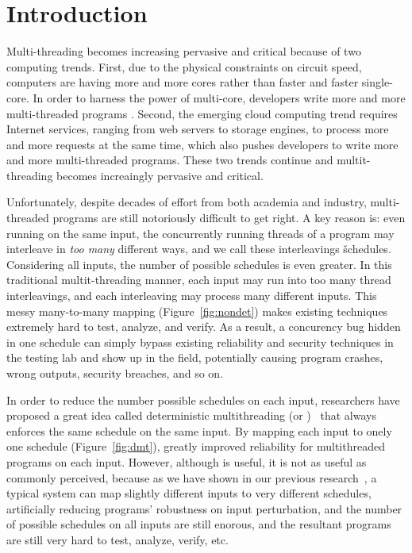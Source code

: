 \section{Introduction} \label{ch:intro}

Multi-threading becomes increasing pervasive and critical because of two 
computing trends. First, due to the physical constraints on circuit speed, computers are having
more and more cores rather than faster and faster single-core. In order to 
harness the power of multi-core, developers write more and more multi-threaded programs . 
Second, the emerging cloud computing trend requires Internet services, ranging from 
web servers to storage engines, to process more and more requests at the same time, which also 
pushes developers to write more and more multi-threaded programs. These two trends continue and 
multit-threading becomes increaingly pervasive and critical.

Unfortunately, despite decades of effort from both academia and industry, 
multi-threaded programs are still notoriously difficult to get right. A key 
reason is: even running on the same input, the concurrently running threads of 
a program may interleave in \emph{too many} different ways, and we call these interleavings 
\v{schedules}. Considering all inputs, the number of possible schedules is even greater. 
In this traditional multit-threading manner, each input may run into too many 
thread interleavings, and each interleaving may process many different inputs.
This messy many-to-many mapping (Figure~\ref{fig:nondet}) makes existing techniques extremely
hard to test, analyze, and verify. As a result, a concurency bug hidden in one schedule can 
simply bypass existing reliability and security techniques in the testing lab and show up in the field, 
potentially causing program crashes, wrong outputs, security breaches, and so on.

In order to reduce the number possible schedules on each input, researchers 
have proposed a great idea called deterministic multithreading (or \dmt)~\cite{dthreads:sosp11,
dpj:oopsla09, dmp:asplos09, kendo:asplos09, coredet:asplos10} that 
always enforces the same schedule on the same input. By mapping each input to onely 
one schedule (Figure~\ref{fig:dmt}), \dmt greatly improved reliability for multithreaded programs on each input.
However, although \dmt is useful, it is not as useful as commonly perceived, 
because as we have shown in our previous research~\cite{cui:tern:osdi10},
a typical \dmt system can map slightly different inputs to 
very different schedules, artificially reducing programs' robustness on input 
perturbation, and the number of possible schedules on all inputs are still 
enorous, and the resultant programs are still very hard to test, analyze, verify, etc.

